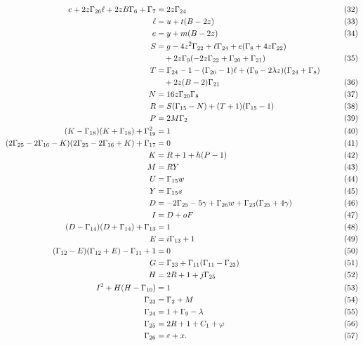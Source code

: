 \documentclass[11pt]{article}
\begin{document}
\begin{align}
e+2z\Gamma_{26}\ell+2zB\Gamma_6+\Gamma_7&=2z\Gamma_{24} &&\tag{32}\\
\ell&=u+t(B-2z) &&\tag{33}\\
e&=y+m(B-2z) &&\tag{34}\\
S&=g-4z^2\Gamma_{22}+\ell\Gamma_{24}+e(\Gamma_8+4z\Gamma_{22})\notag\\
 &\quad+2z\Gamma_9(-2z\Gamma_{22}+\Gamma_{20}+\Gamma_{21}) &&\tag{35}\\
T&=\Gamma_{24}-1-(\Gamma_{26}-1)\ell
 +(\Gamma_9-2\lambda z)(\Gamma_{24}+\Gamma_8)\notag\\
 &\quad+2z(B-2)\Gamma_{21} &&\tag{36}\\
N&=16z\Gamma_{20}\Gamma_8 &&\tag{37}\\
R&=S(\Gamma_{15}-N)+(T+1)(\Gamma_{15}-1) &&\tag{38}\\
P&=2M\Gamma_2 &&\tag{39}\\
(K-\Gamma_{18})(K+\Gamma_{18})+\Gamma_{19}^{2}&=1 &&\tag{40}\\
(2\Gamma_{25}-2\Gamma_{16}-K)(2\Gamma_{25}-2\Gamma_{16}+K)
 +\Gamma_{17}&=0 &&\tag{41}\\
K&=R+1+h(P-1) &&\tag{42}\\
M&=RY &&\tag{43}\\
U&=\Gamma_{15}w &&\tag{44}\\
Y&=\Gamma_{15}s &&\tag{45}\\
D&=-2\Gamma_{25}-5\gamma+\Gamma_{26}w
       +\Gamma_{23}(\Gamma_{25}+4\gamma) &&\tag{46}\\
I&=D+oF &&\tag{47}\\
(D-\Gamma_{14})(D+\Gamma_{14})+\Gamma_{13}&=1 &&\tag{48}\\
E&=i\Gamma_{13}+1 &&\tag{49}\\
(\Gamma_{12}-E)(\Gamma_{12}+E)-\Gamma_{11}+1&=0 &&\tag{50}\\
G&=\Gamma_{23}+\Gamma_{11}(\Gamma_{11}-\Gamma_{23}) &&\tag{51}\\
H&=2R+1+j\Gamma_{25} &&\tag{52}\\
I^2+H(H-\Gamma_{10})&=1 &&\tag{53}\\
\Gamma_{23}&=\Gamma_2+M &&\tag{54}\\
\Gamma_{24}&=1+\Gamma_9-\lambda &&\tag{55}\\
\Gamma_{25}&=2R+1+C_1+\varphi &&\tag{56}\\
\Gamma_{26}&=\varepsilon+x. &&\tag{57}
\end{align}
\end{document}
